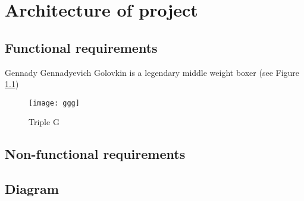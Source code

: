 \chapter{Architecture of project}\label{ch:B}

\section{Functional requirements }
Gennady Gennadyevich Golovkin is a legendary middle weight boxer (see Figure \ref{fig:ggg})

\begin{figure}[h]
    \centering
    \texttt{[image: ggg]}
    \caption{Triple G}
    \label{fig:ggg}
\end{figure}

\section{Non-functional requirements}

\section{Diagram}